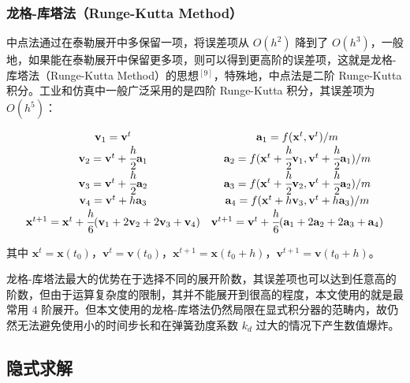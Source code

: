 \documentclass[UTF8]{ctexart}
\begin{document}
\subsubsection{龙格-库塔法（Runge-Kutta Method）}

中点法通过在泰勒展开中多保留一项，将误差项从 $O(h^2)$ 降到了 $O(h^3)$，一般地，如果能在泰勒展开中保留更多项，则可以得到更高阶的误差项，这就是龙格-库塔法（Runge-Kutta Method）的思想${}^{[9]}$，特殊地，中点法是二阶 Runge-Kutta 积分。工业和仿真中一般广泛采用的是四阶 Runge-Kutta 积分，其误差项为 $O(h^5)$：

\begin{large}
\begin{equation}
\begin{matrix}
\mathbf{v}_1 = \mathbf{v}^t & \mathbf{a}_1 = f(\mathbf{x}^t, \mathbf{v}^t) / m \\
\mathbf{v}_2 = \mathbf{v}^t + \cfrac{h}{2} \mathbf{a}_1 & \mathbf{a}_2 = f(\mathbf{x}^t + \cfrac{h}{2} \mathbf{v}_1, \mathbf{v}^t + \cfrac{h}{2} \mathbf{a}_1) / m \\
\mathbf{v}_3 = \mathbf{v}^t + \cfrac{h}{2} \mathbf{a}_2 & \mathbf{a}_3 = f(\mathbf{x}^t + \cfrac{h}{2} \mathbf{v}_2, \mathbf{v}^t + \cfrac{h}{2} \mathbf{a}_2) / m \\
\mathbf{v}_4 = \mathbf{v}^t + h \mathbf{a}_3 & \mathbf{a}_4 = f(\mathbf{x}^t + h \mathbf{v}_3, \mathbf{v}^t + h \mathbf{a}_3) / m \\
\mathbf{x}^{t+1} = \mathbf{x}^{t} + \cfrac{h}{6}(\mathbf{v}_1 + 2\mathbf{v}_2 + 2\mathbf{v}_3 + \mathbf{v}_4)
& \mathbf{v}^{t+1} = \mathbf{v}^{t} + \cfrac{h}{6}(\mathbf{a}_1 + 2\mathbf{a}_2 + 2\mathbf{a}_3 + \mathbf{a}_4)
\end{matrix}
\end{equation}
\end{large}

其中 $\mathbf{x}^t = \mathbf{x}(t_0)$，$\mathbf{v}^t = \mathbf{v}(t_0)$，$\mathbf{x}^{t+1} = \mathbf{x}(t_0 + h)$，$\mathbf{v}^{t+1} = \mathbf{v}(t_0 + h)$。

龙格-库塔法最大的优势在于选择不同的展开阶数，其误差项也可以达到任意高的阶数，但由于运算复杂度的限制，其并不能展开到很高的程度，本文使用的就是最常用 $4$ 阶展开。但本文使用的龙格-库塔法仍然局限在显式积分器的范畴内，故仍然无法避免使用小的时间步长和在弹簧劲度系数 $k_d$ 过大的情况下产生数值爆炸。

\subsection{隐式求解}
\end{document}
